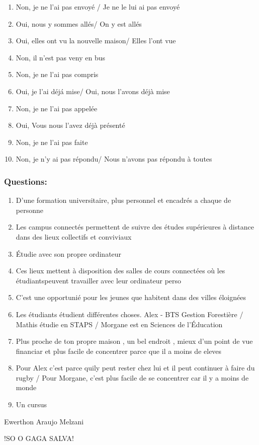 \documentclass{article}
\begin{document}
\begin{enumerate}
    \item Non, je ne l'ai pas envoyé / Je ne le lui ai pas envoyé
    \item Oui, nous y sommes allés/ On y est allés
    \item Oui, elles ont vu la nouvelle maison/ Elles l'ont vue 
    \item Non, il n'est pas veny en bus
    \item Non, je ne l'ai pas compris
    \item Oui, je l'ai déjá mise/ Oui, nous l'avons déjà mise
    \item Non, je ne l'ai pas appelée
    \item Oui, Vous nous l'avez déjà présenté
    \item Non, je ne l'ai pas faite  
    \item Non, je n'y ai pas répondu/ Nous n'avons pas répondu à toutes
\end{enumerate}

\vspace*{1.5 cm}


\subsubsection*{Questions:}

\begin{enumerate}
    \item D'une formation universitaire, plus personnel et encadrés a chaque de personne
    \item Les campus connectés permettent de suivre des études supérieures à distance dans des lieux collectifs et conviviaux
    \item Étudie avec son propre ordinateur 
    \item Ces lieux mettent à disposition des salles de cours connectées où les étudiantspeuvent travailler avec leur ordinateur perso
    \item C'est une opportunié pour les jeunes que habitent dans des villes éloignées 
    \item Les étudiants étudient différentes choses. Alex - BTS Gestion Forestière / Mathis étudie en STAPS / Morgane est en Sciences de l'Éducation
    \item Plus proche de ton propre maison , un bel endroit , mieux d'un point de vue financiar et plus facile de concentrer parce que il a moins de eleves
    \item Pour Alex c'est parce quily peut rester chez lui et il peut continuer à faire du rugby / Pour Morgane, c'est plus facile de se concentrer car il y a moins de monde
    \item Un cursus
\end{enumerate}






\LARGE{Ewerthon Araujo Melzani}

\vspace*{1.5 cm}

\huge{!SO O GAGA SALVA!}
\end{document}
